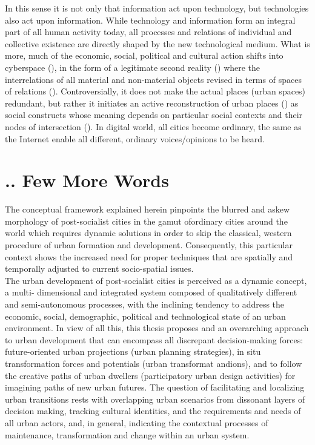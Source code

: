\documentclass[11pt]{report}
\begin{document}
{In this sense it is not only that information act upon technology, but technologies also act upon information.
While technology and information form an integral part of all human activity today, all processes and relations of individual and collective existence are directly shaped by the new technological medium.
What is more, much of the economic, social, political and cultural action shifts into cyberspace (\href{Mitchell}{\citealt{mitchell_city_1996}}), in the form of a legitimate second reality (\href{Baudrillard}{\citealt{baudrillard_l_1983}}) where the interrelations of  all material and non-material objects revised in terms of spaces of relations (\href{Graham}{\citealt{graham_relational_1999}}).
Controversially, it does not make the actual places (urban spaces) redundant, but rather it initiates an active reconstruction of urban places (\href{ref}{\citealt{graham_splintering_2001}}) as social constructs whose meaning depends on particular social contexts and their nodes of intersection (\href{ref}{\citealt{healey_treatment_2004}}).
In digital world, all cities become ordinary, the same as the Internet enable all different, ordinary voices/opinions to be heard.

\section{.. Few More Words}

The conceptual framework explained herein pinpoints the blurred and askew morphology of post-socialist cities in the gamut ofordinary cities around the world which requires dynamic solutions in order to skip the classical, western procedure of urban formation and development. Consequently, this particular context shows the increased need for proper techniques that are spatially and temporally adjusted to current socio-spatial issues. 
\\

The urban development of post-socialist cities is perceived as a dynamic concept, a multi- dimensional and integrated system composed of qualitatively different and semi-autonomous processes, with the inclining tendency to address the economic, social, demographic, political and technological state of an urban environment.  In view of all this, this thesis proposes and an overarching approach to urban development that can encompass all discrepant decision-making forces: future-oriented urban projections (urban planning strategies), in situ transformation forces and potentials (urban transformat andions), and to follow the creative paths of urban dwellers (participatory urban design activities) for imagining paths of new urban futures.
The question of facilitating and localizing urban transitions rests with overlapping urban scenarios from dissonant layers of decision making, tracking cultural identities, and the requirements and needs of all urban actors, and, in general, indicating the contextual processes of maintenance, transformation and change within an urban system.

}
\end{document}
